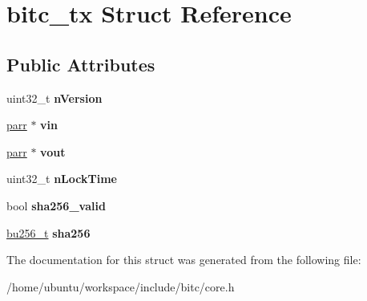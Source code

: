 \hypertarget{structbitc__tx}{\section{bitc\-\_\-tx Struct Reference}
\label{structbitc__tx}
}
\subsection*{Public Attributes}
\begin{DoxyCompactItemize}
\item 
\hypertarget{structbitc__tx_a46e69d128e042721ee09e626c0b164a6}{uint32\-\_\-t {\bfseries n\-Version}}\label{structbitc__tx_a46e69d128e042721ee09e626c0b164a6}

\item 
\hypertarget{structbitc__tx_a753c0065e8a4984685c9bfbc2615fd3a}{\hyperlink{structparr}{parr} $\ast$ {\bfseries vin}}\label{structbitc__tx_a753c0065e8a4984685c9bfbc2615fd3a}

\item 
\hypertarget{structbitc__tx_ad2095dd1858dc76851c38684eb2ddd6d}{\hyperlink{structparr}{parr} $\ast$ {\bfseries vout}}\label{structbitc__tx_ad2095dd1858dc76851c38684eb2ddd6d}

\item 
\hypertarget{structbitc__tx_a559501626988afa8fd4e963c2a387fda}{uint32\-\_\-t {\bfseries n\-Lock\-Time}}\label{structbitc__tx_a559501626988afa8fd4e963c2a387fda}

\item 
\hypertarget{structbitc__tx_ac55fdf3cc65831aacdaef24b49e7cbb4}{bool {\bfseries sha256\-\_\-valid}}\label{structbitc__tx_ac55fdf3cc65831aacdaef24b49e7cbb4}

\item 
\hypertarget{structbitc__tx_a7f201de4998f713cc66d9e7c9f0b3e96}{\hyperlink{structbu256}{bu256\-\_\-t} {\bfseries sha256}}\label{structbitc__tx_a7f201de4998f713cc66d9e7c9f0b3e96}

\end{DoxyCompactItemize}


The documentation for this struct was generated from the following file\-:\begin{DoxyCompactItemize}
\item 
/home/ubuntu/workspace/include/bitc/core.\-h\end{DoxyCompactItemize}
